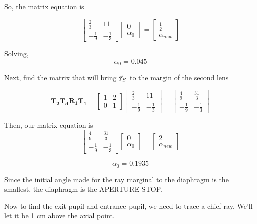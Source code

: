 \documentclass[a4paper]{article}
\begin{document}
So, the matrix equation is 

$$ \begin{bmatrix}
    \frac{2}{3} & 11\\
    - \frac{1}{9} & - \frac{1}{3}
\end{bmatrix}
\begin{bmatrix}
    0 \\
    \alpha_0
\end{bmatrix}
=
\begin{bmatrix}
    \frac{1}{2}   \\
    \alpha_{new}
\end{bmatrix}$$

Solving,
$$\alpha_{0} = 0.045$$

Next, find the matrix that will bring $\va{r}_S$ to the margin of the second lens

$$ \bm{T_2}\bm{T_d}\bm{R_1}\bm{T_1} = 
\begin{bmatrix}
    1 & 2\\
    0 & 1
\end{bmatrix}
\begin{bmatrix}
    \frac{2}{3} & 11\\
    - \frac{1}{9} & - \frac{1}{3}
\end{bmatrix} =
\begin{bmatrix}
    \frac{4}{9} & \frac{31}{3}\\
    - \frac{1}{9} & - \frac{1}{3}
\end{bmatrix}
$$

Then, our matrix equation is
$$
\begin{bmatrix}
    \frac{4}{9} & \frac{31}{3}\\
    - \frac{1}{9} & - \frac{1}{3}
\end{bmatrix}
\begin{bmatrix}
    0 \\
    \alpha_0
\end{bmatrix}
=
\begin{bmatrix}
    2   \\
    \alpha_{new}
\end{bmatrix}$$

$$ \alpha_0 = 0.1935$$

Since the initial angle made for the ray marginal to the diaphragm is the smallest, the diaphragm is the APERTURE STOP.
    
Now to find the exit pupil and entrance pupil, we need to trace a chief ray. We'll let it be 1 cm above the axial point.
\end{document}
